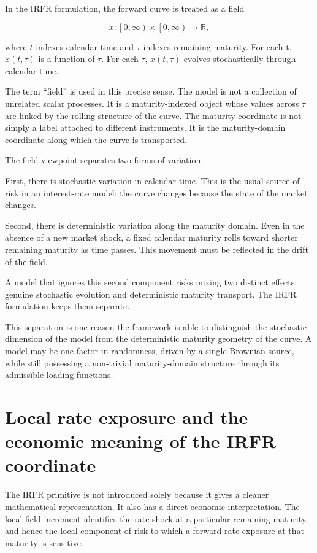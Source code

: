 \documentclass[11pt,oneside]{book}
\begin{document}
In the IRFR formulation, the forward curve is treated as a field

\[
x : \left[0,\infty\right) \times \left[0,\infty\right) \to \mathbb{R},
\]

where \(t\) indexes calendar time and $\tau$ indexes remaining maturity. For each
t, $x(t,\tau)$ is a function of $\tau$. For each $\tau$, $x(t,\tau)$ evolves stochastically
through calendar time.

The term ``field'' is used in this precise sense. The model is not a
collection of unrelated scalar processes. It is a maturity-indexed
object whose values across $\tau$ are linked by the rolling structure of the
curve. The maturity coordinate is not simply a label attached to
different instruments. It is the maturity-domain coordinate along which
the curve is transported.

The field viewpoint separates two forms of variation.

First, there is stochastic variation in calendar time. This is the usual
source of risk in an interest-rate model: the curve changes because the
state of the market changes.

Second, there is deterministic variation along the maturity domain. Even
in the absence of a new market shock, a fixed calendar maturity rolls
toward shorter remaining maturity as time passes. This movement must be
reflected in the drift of the field.

A model that ignores this second component risks mixing two distinct
effects: genuine stochastic evolution and deterministic maturity
transport. The IRFR formulation keeps them separate.

This separation is one reason the framework is able to distinguish the
stochastic dimension of the model from the deterministic maturity
geometry of the curve. A model may be one-factor in randomness, driven
by a single Brownian source, while still possessing a non-trivial
maturity-domain structure through its admissible loading functions.

\section{Local rate exposure and the economic meaning of the IRFR
coordinate}\label{local-rate-exposure-and-the-economic-meaning-of-the-irfr-coordinate}

The IRFR primitive is not introduced solely because it gives a cleaner
mathematical representation. It also has a direct economic
interpretation. The local field increment identifies the rate shock at a
particular remaining maturity, and hence the local component of risk to
which a forward-rate exposure at that maturity is sensitive.
\end{document}
